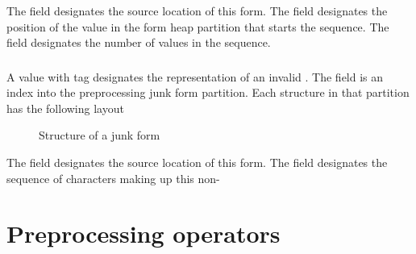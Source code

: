 The field  designates the source location of this form.  The
field  designates the position of the  value
in the form heap partition that starts the sequence.
The field  designates the number of  values
in the sequence.


\subsubsection{}
\label{sec:ifc:FormSort:Junk}

A  value  with tag  designates the 
representation of an invalid .
The  field is an index into
the preprocessing junk form partition.  Each structure in that partition
has the following layout
%
\begin{figure}[H]
  \centering
  \caption{Structure of a junk form}
  \label{fig:ifc-junk-form}
\end{figure}

The field  designates the source location of this form.  The
field  designates the sequence of characters making up
this non-



\section{Preprocessing operators}
\label{sec:ifc-preprocessing-operators}

